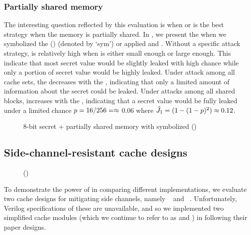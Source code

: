 \subsubsection{Partially shared memory}
 The interesting
question reflected by this evaluation is when \primeprobe or
\flushreload is the best strategy when the memory is partially
shared. In , we present the
\JaccardRand{\secretsSetSize} when we symbolized the
\ACIFn{}(\loadVar) (denoted by `sym') or applied \primeprobe and
\flushreload. Without a specific attack strategy,
\JaccardRand{\secretsSetSize} is relatively high when
\secretsSetSize is either small enough or large enough. This indicate
that most secret value would be slightly leaked with high chance while
only a portion of secret value would be highly leaked. Under
\primeprobe attack among all cache sets, the
\JaccardRand{\secretsSetSize} decreases with the \secretsSetSize,
indicating that only a limited amount of information about the secret
could be leaked. Under \flushreload attacks among all shared blocks,
\JaccardRand{\secretsSetSize} increases with the \secretsSetSize,
indicating that a secret value would be fully leaked under a limited
chance $p = 16/256 =\approx$ 0.06 where $\hat{J}_{1} = (1-
(1-p)^2)\approx 0.12$.
\begin{figure}
\resizebox{\linewidth}{!}{\protect\footnotesize}
\caption{8-bit secret + partially shared memory with symbolized \ACIFn{}(\loadVar)}
\label{fig:normal:jaccard:partial}
\end{figure}
\fi

\subsection{Side-channel-resistant cache designs}
\label{dinome:sec:exp:cachedefense}
\begin{figure*}
\centering
{}
\resizebox{0.95\linewidth}{!}{\protect\footnotesize}
\caption{\scatterCache \label{fig:scatterTagarray}}
\endminipage
\centering
{}
\resizebox{0.95\linewidth}{!}{\protect\footnotesize}
\caption{() }
\label{fig:phantomTagarray}
\endminipage
\end{figure*}
To demonstrate the power of \thirdsysname in comparing different
implementations, we evaluate two cache designs for mitigating side
channels, namely \scatterCache~\cite{scatterCache} and
~\cite{phantomCache}.  Unfortunately, Verilog
specifications of these are unavailable, and so we implemented two
simplified cache modules (which we continue to refer to as
\scatterCache and ) in \boom following their paper
designs.

